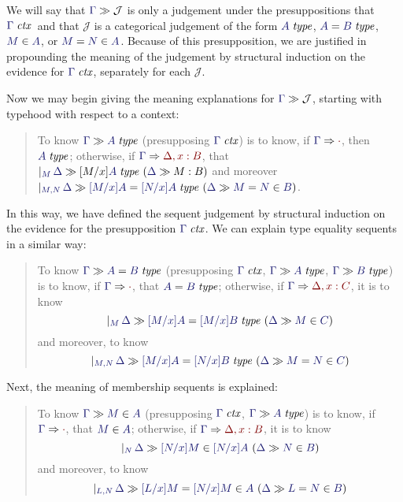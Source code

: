 \documentclass[main.tex]{subfiles}
\begin{document}
We will say that $\sequent{\Gamma}{\mathcal{J}}$ is only a judgement under the
presuppositions that $\isctx\Gamma$\ and that $\mathcal{J}$ is a categorical
judgement of the form $\isset{A}$, $\eisset{A}{B}$, $\ver{M}{A}$, or
$\ever{M}{N}{A}$. Because of this presupposition, we are justified in
propounding the meaning of the judgement by structural induction on the
evidence for $\isctx\Gamma$, separately for each $\mathcal{J}$.

Now we may begin giving the meaning explanations for
$\sequent{\Gamma}{\mathcal{J}}$, starting with typehood with respect to a context:

\begin{quote}

  To know $\sequent{\Gamma}{\isset{A}}$ (presupposing $\isctx\Gamma$) is to
know, if $\reduce{\Gamma}{\cdot}$, then $\isset{A}$; otherwise, if
$\reduce{\Gamma}{\Delta,x:B}$, that
$\genj{M}{\hyp{\sequent{\Delta}{[M/x]\isset{A}}}{\sequent{\Delta}{M:B}}}$ and
moreover
$\genj{M,N}{\hyp{\sequent{\Delta}{\eisset{[M/x]A}{[N/x]A}}}{\sequent{\Delta}{\ever{M}{N}{B}}}}$.

\end{quote}

In this way, we have defined the sequent judgement by structural induction on
the evidence for the presupposition $\isctx\Gamma$. We can explain type
equality sequents in a similar way:

\begin{quote}
  To know $\sequent{\Gamma}{\eisset{A}{B}}$ (presupposing $\isctx\Gamma$, $\sequent{\Gamma}{\isset{A}}$, $\sequent{\Gamma}{\isset{B}}$) is to know, if $\reduce{\Gamma}{\cdot}$, that $\eisset{A}{B}$; otherwise, if $\reduce{\Gamma}{\Delta,x:C}$, it is to know
  \[
    \genj{M}{
      \hyp{
        \sequent{\Delta}{
          \eisset{[M/x]A}{[M/x]B}
        }
      }{
        \sequent{\Delta}{
          \ver{M}{C}
        }
      }
    }
  \]
  and moreover, to know
  \[
    \genj{M,N}{
      \hyp{
        \sequent{\Delta}{
          \eisset{[M/x]A}{[N/x]B}
        }
      }{
        \sequent{\Delta}{
          \ever{M}{N}{C}
        }
      }
    }
  \]
\end{quote}

Next, the meaning of membership sequents is explained:

\begin{quote}
  To know $\sequent{\Gamma}{\ver{M}{A}}$ (presupposing $\isctx\Gamma$, $\sequent{\Gamma}{\isset{A}}$) is to know, if
  $\reduce\Gamma\cdot$, that $\ver{M}{A}$; otherwise, if
  $\reduce{\Gamma}{\Delta,x:B}$, it is to know
  \[
    \genj{N}{
      \hyp{
        \sequent{\Delta}{
          \ver{[N/x]M}{[N/x]A}
        }
      }{
        \sequent{\Delta}{
          \ver{N}{B}
        }
      }
    }
  \]
  and moreover, to know
  \[
    \genj{L,N}{
      \hyp{
        \sequent{\Delta}{
          \ever{[L/x]M}{[N/x]M}{A}
        }
      }{
        \sequent{\Delta}{
          \ever{L}{N}{B}
        }
      }
    }
  \]
\end{quote}
\end{document}
